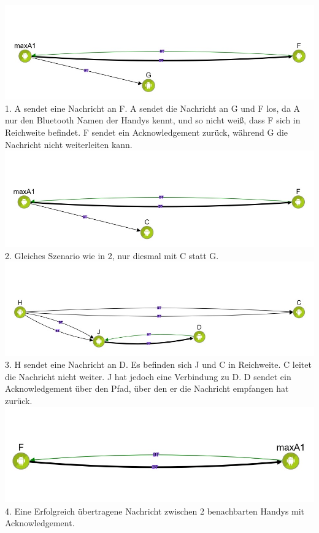 \includegraphics[width=1.0\textwidth]{belege/grosstests/Bilder/Erfolg4.jpg}\\
1. A sendet eine Nachricht an F. A sendet die Nachricht an G und F los, da A nur den
Bluetooth Namen der Handys kennt, und so nicht weiß, dass F sich in
Reichweite befindet. F sendet ein Acknowledgement zurück, während G die
Nachricht nicht weiterleiten kann.\\
\includegraphics[width=1.0\textwidth]{belege/grosstests/Bilder/Erfolg3.jpg}\\
2. Gleiches Szenario wie in 2, nur diesmal mit C statt G.\\
\includegraphics[width=1.0\textwidth]{belege/grosstests/Bilder/Erfolg2.jpg}\\ 3. H sendet eine
Nachricht an D. Es befinden sich J und C in Reichweite. C leitet die
Nachricht nicht weiter. J hat jedoch eine Verbindung zu D. D sendet ein
Acknowledgement über den Pfad, über den er die Nachricht empfangen hat
zurück.\\ \includegraphics[width=1.0\textwidth]{belege/grosstests/Bilder/Erfolg1.jpg} \\4. Eine
Erfolgreich übertragene Nachricht zwischen 2 benachbarten Handys mit
Acknowledgement.

